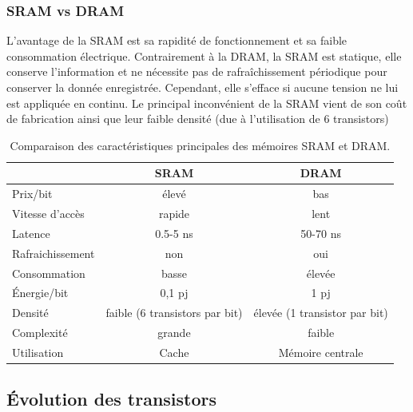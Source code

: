     
    \subsubsection{SRAM vs DRAM}
    
        L'avantage de la SRAM est sa rapidité de fonctionnement et sa faible consommation électrique. Contrairement à la DRAM, la SRAM est statique, elle conserve l'information et ne nécessite pas de rafraîchissement périodique pour conserver la donnée enregistrée. Cependant, elle s'efface si aucune tension ne lui est appliquée en continu.
        Le principal inconvénient de la SRAM vient de son coût de fabrication ainsi que leur faible densité (due à l'utilisation de 6 transistors)
    
    
        \begin{table}[]
        \centering
        \begin{tabular}{l|c|c|}
        \cline{2-3}
         & SRAM & DRAM \\ \hline
        \multicolumn{1}{|l|}{Prix/bit} & élevé & bas \\ \hline
        \multicolumn{1}{|l|}{Vitesse d'accès} & rapide & lent \\ \hline
        \multicolumn{1}{|l|}{Latence} & 0.5-5 ns & 50-70 ns \\ \hline
        \multicolumn{1}{|l|}{Rafraichissement} & non & oui \\ \hline
        \multicolumn{1}{|l|}{Consommation} & basse & élevée \\ \hline
        \multicolumn{1}{|l|}{Énergie/bit} & 0,1 pj & 1 pj \\ \hline
        \multicolumn{1}{|l|}{Densité} & faible (6 transistors par bit) & élevée (1 transistor par bit) \\ \hline
        \multicolumn{1}{|l|}{Complexité} & grande & faible \\ \hline
        \multicolumn{1}{|l|}{Utilisation} & Cache & Mémoire centrale \\ \hline
        \end{tabular}%
        \caption{Comparaison des caractéristiques principales des mémoires SRAM et DRAM.}
        \label{tab:my-table}
        \end{table}
            
    


\subsection{Évolution des transistors}

